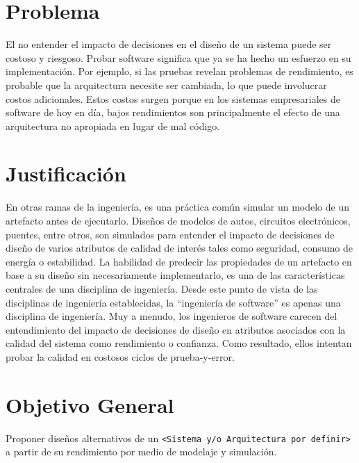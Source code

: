 \hspace{-0.6cm}


\section{Problema}
El no entender el impacto de decisiones en el diseño de un sistema puede ser costoso y riesgoso. Probar  software significa que ya se ha hecho un esfuerzo en su implementación. Por ejemplo, si las pruebas revelan problemas de rendimiento, es probable que la arquitectura necesite ser cambiada, lo que puede involucrar costos adicionales. Estos costos surgen porque en los sistemas empresariales de software de hoy en día, bajos rendimientos son principalmente el efecto de una arquitectura no apropiada en lugar de mal código.

\section{Justificación}
En otras ramas de la ingeniería, es una práctica común simular un modelo de un artefacto antes de ejecutarlo. Diseños de modelos de autos, circuitos electrónicos, puentes, entre otros, son simulados para entender el impacto de decisiones de diseño de varios atributos de calidad de interés tales como seguridad, consumo de energía o estabilidad. La habilidad de predecir las propiedades de un artefacto en base a su diseño sin necesariamente implementarlo, es una de las características centrales de una disciplina de ingeniería. Desde este punto de vista de las disciplinas de ingeniería establecidas, la ``ingeniería de software'' es apenas una disciplina de ingeniería. Muy a menudo, los ingenieros de software carecen del entendimiento del impacto de decisiones de diseño en atributos asociados con la calidad del sistema como rendimiento o confianza. Como resultado, ellos intentan probar la calidad en costosos ciclos de prueba-y-error.

\section{Objetivo General}
Proponer diseños alternativos de un \texttt{<Sistema y/o Arquitectura por definir>} a partir de su rendimiento por medio de modelaje y simulación.
